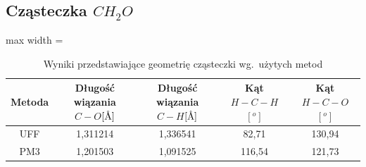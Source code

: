 \documentclass[a4paper,12pt]{extarticle}
\newcommand{\angstrom}{\mbox{\normalfont\AA}}
\begin{document}
  \subsection{Cząsteczka \( CH_2O \)}
  \begin{table}[h]
    \begin{adjustbox}{max width = \textwidth}
      \begin{tabular}{c|c|c|c|c}
      \textbf{Metoda}         & \textbf{Długość wiązania \( C-O \)\( [\angstrom] \)} & \textbf{Długość wiązania \( C-H \)\( [\angstrom] \)} & \textbf{Kąt \( H-C-H \)\( [^o] \)} & \textbf{Kąt \( H-C-O \)\( [^o] \)} \\ \hline
      UFF                     & 1,311214                                             & 1,336541                                             & 82,71                              & 130,94                             \\
      PM3                     & 1,201503                                             & 1,091525                                             & 116,54                             & 121,73                              
      \end{tabular}
    \end{adjustbox}
    \caption{Wyniki przedstawiające geometrię cząsteczki wg.\ użytych metod}
    \label{tab:wyniki_geomch2o}
  \end{table}
  \begin{table}[h]
    \caption{Wyniki przedstawiające właściwości fizyczne wg.\ użytych metod}
    \label{tab:wynikich2o}
  \end{table}
\end{document}
